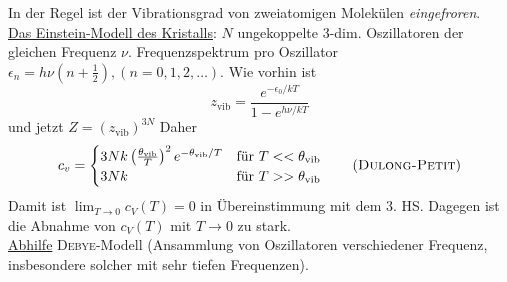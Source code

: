 \begin{enumerate}[A)]
    In der Regel ist der Vibrationsgrad von zweiatomigen Molekülen \emph{eingefroren}. \\[\baselineskip]
    \underline{Das Einstein-Modell des Kristalls}: $N$ ungekoppelte 3-dim. Oszillatoren der gleichen Frequenz $\nu$.
    Frequenzspektrum pro Oszillator $\epsilon_n = h \nu \left( n + \frac{1}{2} \right), (n=0, 1, 2, \ldots)$. Wie vorhin ist
    \begin{equation}
        z_\text{vib} = \frac{e^{-\epsilon_0 / kT}}{1-e^{h \nu / kT}}
    \end{equation}
    und jetzt $Z = \left( z_\text{vib} \right)^{3N}$
    Daher
    \begin{equation}
        c_v =
        \begin{cases}
            3 N k \left( \frac{\theta_\text{vib}}{T} \right)^2 e^{- \theta_\text{vib} / T} & \text{für } T << \theta_\text{vib} \\
            3 N k & \text{für } T >> \theta_\text{vib}
        \end{cases}
        \qquad \left( \text{\textsc{Dulong-Petit}} \right)
    \end{equation}
    Damit ist $\lim_{T \to 0} c_V(T) = 0$ in Übereinstimmung mit dem 3. HS. Dagegen ist die Abnahme von $c_V(T)$ mit $T \to 0$ zu stark.\\
    \underline{Abhilfe} \textsc{Debye}-Modell (Ansammlung von Oszillatoren verschiedener Frequenz, insbesondere solcher mit sehr tiefen Frequenzen).
\end{enumerate}

